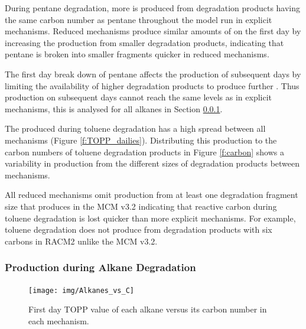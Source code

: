 During pentane degradation, more  is produced from degradation products having the same carbon number as pentane throughout the model run in explicit mechanisms.
Reduced mechanisms produce similar amounts of  on the first day by increasing the  production from smaller degradation products, indicating that pentane is broken into smaller fragments quicker in reduced mechanisms.  

The first day break down of pentane affects the  production of subsequent days by limiting the availability of higher degradation products to produce further .
Thus  production on subsequent days cannot reach the same levels as in explicit mechanisms, this is analysed for all alkanes in Section \ref{sss:alkanes}.

The  produced during toluene degradation has a high spread between all mechanisms (Figure \ref{f:TOPP_dailies}).
Distributing this  production to the carbon numbers of toluene degradation products in Figure \ref{f:carbon} shows a variability in  production from the different sizes of degradation products between mechanisms.

All reduced mechanisms omit  production from at least one degradation fragment size that produces  in the MCM v3.2 indicating that reactive carbon during toluene degradation is lost quicker than more explicit mechanisms.
For example, toluene degradation does not produce  from degradation products with six carbons in RACM2 unlike the MCM v3.2.

%

\subsubsection[Ox Production during Alkane Degradation]{ Production during Alkane Degradation} \label{sss:alkanes}

\begin{figure}
    \centering
    \texttt{[image: img/Alkanes\_vs\_C]}
    \vspace{0mm}
    \caption{First day TOPP value of each alkane versus its carbon number in each mechanism.}
    \vspace{-4mm}
    \label{f:alkanes_C}
\end{figure}

